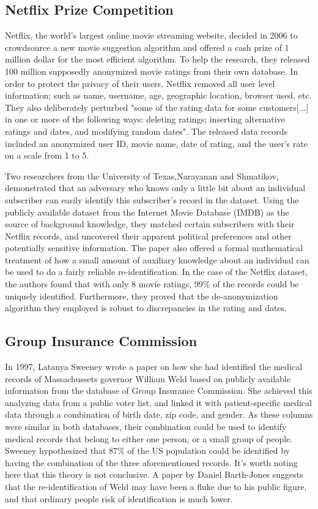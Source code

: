 \subsection{Netflix Prize Competition}
Netflix, the world's largest online movie streaming website, decided in 2006 to crowdsource a new movie suggestion algorithm and offered a cash prize of 1 million dollar for the most efficient algorithm. To help the research, they released 100 million supposedly anonymized movie ratings from their own database. In order to protect the privacy of their users, Netflix removed all user level information; such as name, username, age, geographic location, browser used, etc. They also deliberately perturbed "some of the rating data for some customers[...] in one or more of the following ways: deleting ratings; inserting alternative ratings and dates, and modifying random dates"\cite{bell2007netflix}. The released data records included an anonymized user ID, movie name, date of rating, and the user's rate on a scale from 1 to 5. 

Two researchers from the University of Texas,Narayanan and Shmatikov\cite{narayanan2008robust}, demonstrated that an adversary who knows only a little bit about an individual subscriber can easily identify this subscriber's record in the dataset. Using the publicly available dataset from the Internet Movie Database (IMDB) as the source of background knowledge, they matched certain subscribers with their Netflix records, and uncovered their apparent political preferences and other potentially sensitive information. The paper also offered a formal mathematical treatment of how a small amount of auxiliary knowledge about an individual can be used to do a fairly reliable re-identification. In the case of the Netflix dataset, the authors \cite{narayanan2008robust} found that with only 8 movie ratings, 99\% of the records could be uniquely identified. Furthermore, they proved that the de-anonymization algorithm they employed is robust to discrepancies in the rating and dates.

\subsection{Group Insurance Commission} \label{sec:GIC}
In 1997, Latanya Sweeney wrote a paper on how she had identified the medical records of Massachussets governor William Weld based on publicly available information from the database of Group Insurance Commission. She achieved this analyzing data from a public voter list, and linked it with patient-specific medical data through a combination of birth date, zip code, and gender\cite{sweeney2002k}. As these columns were similar in both databases, their combination could be used to identify medical records that belong to either one person, or a small group of people. Sweeney hypothesized that 87\% of the US population could be identified by having the combination of the three aforementioned records. It's worth noting here that this theory is not conclusive. A paper by Daniel Barth-Jones suggests that the re-identification of Weld may have been a fluke due to his public figure, and that ordinary people risk of identification is much lower\cite{barth2012re}. 

